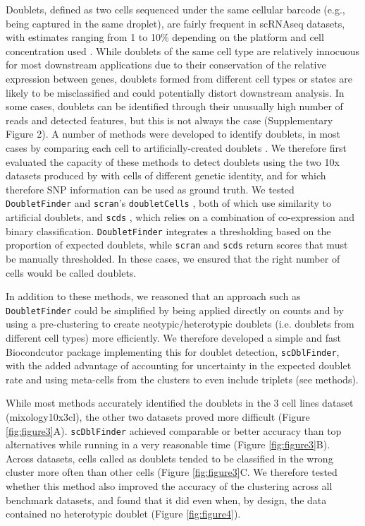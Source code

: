 \documentclass{bmcart}
\begin{document}
Doublets, defined as two cells sequenced under the same cellular barcode (e.g., being captured in the same droplet), are fairly frequent in scRNAseq datasets, with estimates ranging from 1 to 10\% depending on the platform and cell concentration used \citep{bloomEstimating2018,kangMultiplexedDemuxlet2018}. While doublets of the same cell type are relatively innocuous for most downstream applications due to their conservation of the relative expression between genes, doublets formed from different cell types or states are likely to be misclassified and could potentially distort downstream analysis. In some cases, doublets can be identified through their unusually high number of reads and detected features, but this is not always the case (Supplementary Figure 2). A number of methods were developed to identify doublets, in most cases by comparing each cell to artificially-created doublets \citep{mcginnisDoubletfinder2019, LunScran2016, BaisScds2019}. We therefore first evaluated the capacity of these methods to detect doublets using the two 10x datasets produced by \citep{tianMixology2018} with cells of different genetic identity, and for which therefore SNP information can be used as ground truth. We tested \texttt{DoubletFinder} \citep{mcginnisDoubletfinder2019} and \texttt{scran}'s \texttt{doubletCells} \citep{LunScran2016}, both of which use similarity to artificial doublets, and \texttt{scds} \citep{BaisScds2019}, which relies on a combination of co-expression and binary classification. \texttt{DoubletFinder} integrates a thresholding based on the proportion of expected doublets, while \texttt{scran} and \texttt{scds} return scores that must be manually thresholded. In these cases, we ensured that the right number of cells would be called doublets.

In addition to these methods, we reasoned that an approach such as \texttt{DoubletFinder} could be simplified by being applied directly on counts and by using a pre-clustering to create neotypic/heterotypic doublets (i.e. doublets from different cell types) more efficiently. We therefore developed a simple and fast Biocondcutor package implementing this for doublet detection, \texttt{scDblFinder}, with the added advantage of accounting for uncertainty in the expected doublet rate and using meta-cells from the clusters to even include triplets (see methods).

While most methods accurately identified the doublets in the 3 cell lines dataset (mixology10x3cl), the other two datasets proved more difficult (Figure \ref{fig:figure3}A). \texttt{scDblFinder} achieved comparable or better accuracy than top alternatives while running in a very reasonable time (Figure \ref{fig:figure3}B). Across datasets, cells called as doublets tended to be classified in the wrong cluster more often than other cells (Figure \ref{fig:figure3}C. We therefore tested whether this method also improved the accuracy of the clustering across all benchmark datasets, and found that it did even when, by design, the data contained no heterotypic doublet (Figure \ref{fig:figure4}).
\end{document}
